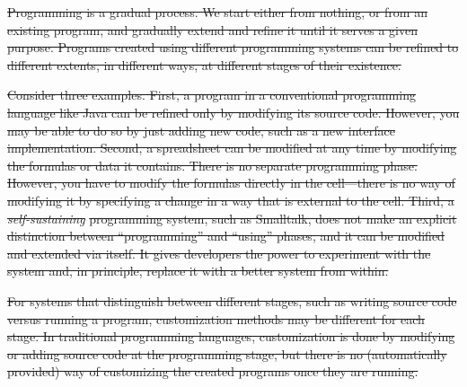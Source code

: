 \documentclass[english,submission]{programming}
\providecommand{\DIFdel}[1]{{\protect\color{red}\sout{#1}}}                      %
\providecommand{\DIFdelbegin}{} %
\begin{document}
\DIFdelbegin %


\DIFdel{Programming is a gradual process. We start either from nothing, or from
an existing program, and gradually extend and refine it until it serves
a given purpose. Programs created using different programming systems
can be refined to different extents, in different ways, at different
stages of their existence.
}%

\DIFdel{Consider three examples. First, a program in a conventional programming
language like Java can be refined only by modifying its source code.
However, you may be able to do so by just adding new code, such as a new
interface implementation. Second, a spreadsheet can be modified at any
time by modifying the formulas or data it contains. There is no separate
programming phase. However, you have to modify the formulas directly in
the cell---there is no way of modifying it by specifying a change in a
way that is external to the cell. Third, a }\emph{\DIFdel{self-sustaining}}
\DIFdel{programming system, such as Smalltalk, does not make an explicit
distinction between ``programming'' and ``using'' phases, and it can be
modified and extended via itself. It gives developers the power to
experiment with the system and, in principle, replace it with a better
system from within.
}%


\DIFdel{For systems that distinguish between different stages, such as writing
source code versus running a program, customization methods may be
different for each stage. In traditional programming languages,
customization is done by modifying or adding source code at the
programming stage, but there is no (automatically provided) way of
customizing the created programs once they are running.
}%
\end{document}
